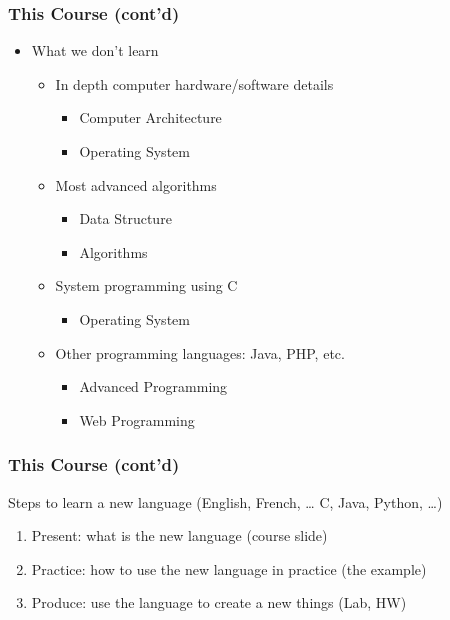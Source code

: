 \documentclass{../c-lecture}
\begin{document}
\begin{frame}
  \frametitle{This Course (cont’d)}
  \begin{itemize}
    \item What we don’t learn
    \begin{itemize}
      \item In depth computer hardware/software details
      \begin{itemize}
        \color{Aquamarine}
        \item Computer Architecture
        \item Operating System
      \end{itemize}
      \pause%
      \item Most advanced algorithms
      \begin{itemize}
        \color{Aquamarine}
        \item Data Structure
        \item Algorithms
      \end{itemize}
      \pause%
      \item System programming using C
      \begin{itemize}
        \color{Aquamarine}
        \item Operating System
      \end{itemize}
      \pause%
      \item Other programming languages: Java, PHP, etc.
      \begin{itemize}
        \color{Aquamarine}
        \item Advanced Programming
        \item Web Programming
      \end{itemize}
      \pause%
    \end{itemize}
  \end{itemize}
\end{frame}

\begin{frame}
  \frametitle{This Course (cont'd)}
  Steps to learn a new language (English, French, … C, Java, Python, …)

  \begin{enumerate}
    \item Present: what is the new language (course slide)
    \item Practice: how to use the new language in practice (the example)
    \item Produce: use the language to create a new things (Lab, HW)
  \end{enumerate}
\end{frame}
\end{document}
